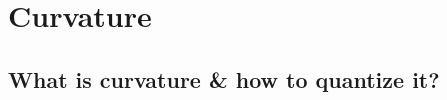 \documentclass[../geometry_main.tex]{subfiles}
\begin{document}
\section{Curvature}


\subsection{What is curvature \& how to quantize it?}
\end{document}
